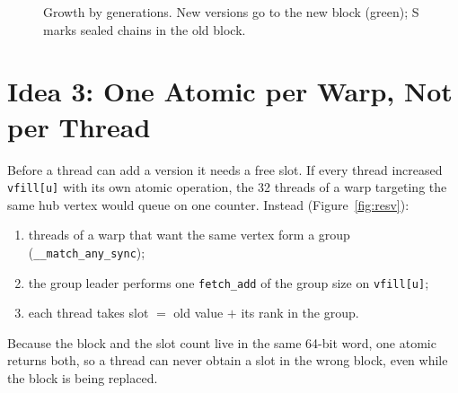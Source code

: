 \documentclass[11pt,a4paper,oneside]{report}
\newcommand{\code}[1]{\texttt{#1}}
\begin{document}
\begin{figure}[H]
\centering
{}
\caption{Growth by generations. New versions go to the new block (green); S marks sealed chains in the old block.}
\label{fig:grow}
\end{figure}

\section{Idea 3: One Atomic per Warp, Not per Thread}
Before a thread can add a version it needs a free slot. If every thread increased \code{vfill[u]} with its own atomic
operation, the 32 threads of a warp targeting the same hub vertex would queue on one counter. Instead
(Figure~\ref{fig:resv}):
\begin{enumerate}
\item threads of a warp that want the same vertex form a group (\code{\_\_match\_any\_sync});
\item the group leader performs one \code{fetch\_add} of the group size on \code{vfill[u]};
\item each thread takes slot $=$ old value $+$ its rank in the group.
\end{enumerate}
Because the block and the slot count live in the same 64-bit word, one atomic returns both, so a thread can never
obtain a slot in the wrong block, even while the block is being replaced.
\end{document}
